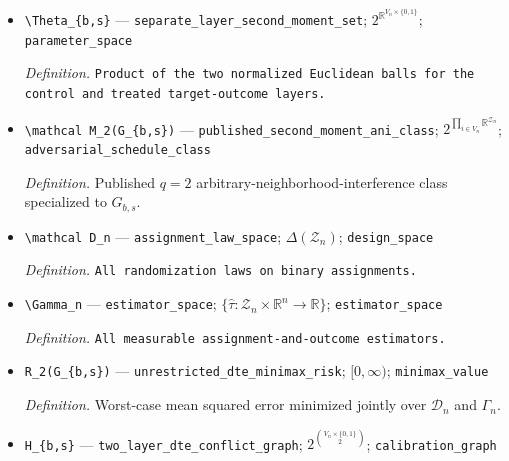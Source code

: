 \documentclass{article}
\begin{document}
\begin{itemize}
  \par\smallskip\noindent\emph{Definition.} \(\tau_{\mathrm{DTE}}(Y)=n^{-1}\sum_{i\in V_n}(u_{i,1}-u_{i,0})\).
  \item \texttt{\textbackslash{}\allowbreak{}Theta\_\allowbreak{}\{b,\allowbreak{}s\}\allowbreak{}} --- \texttt{separate\_\allowbreak{}layer\_\allowbreak{}second\_\allowbreak{}moment\_\allowbreak{}set}; \(2^{\mathbb R^{V_n\times\{0,1\}}}\); \texttt{parameter\_\allowbreak{}space}
  \par\smallskip\noindent\emph{Definition.} \texttt{Product of the two normalized Euclidean balls for the control and treated target-\allowbreak{}outcome layers.}
  \item \texttt{\textbackslash{}\allowbreak{}mathcal M\_\allowbreak{}2(G\_\allowbreak{}\{b,\allowbreak{}s\}\allowbreak{})} --- \texttt{published\_\allowbreak{}second\_\allowbreak{}moment\_\allowbreak{}ani\_\allowbreak{}class}; \(2^{\prod_{i\in V_n}\mathbb R^{\mathcal Z_n}}\); \texttt{adversarial\_\allowbreak{}schedule\_\allowbreak{}class}
  \par\smallskip\noindent\emph{Definition.} Published \(q=2\) arbitrary-neighborhood-interference class specialized to \(G_{b,s}\).
  \item \texttt{\textbackslash{}\allowbreak{}mathcal D\_\allowbreak{}n} --- \texttt{assignment\_\allowbreak{}law\_\allowbreak{}space}; \(\Delta(\mathcal Z_n)\); \texttt{design\_\allowbreak{}space}
  \par\smallskip\noindent\emph{Definition.} \texttt{All randomization laws on binary assignments.}
  \item \texttt{\textbackslash{}\allowbreak{}Gamma\_\allowbreak{}n} --- \texttt{estimator\_\allowbreak{}space}; \(\{\widehat\tau:\mathcal Z_n\times\mathbb R^n\to\mathbb R\}\); \texttt{estimator\_\allowbreak{}space}
  \par\smallskip\noindent\emph{Definition.} \texttt{All measurable assignment-\allowbreak{}and-\allowbreak{}outcome estimators.}
  \item \texttt{R\_\allowbreak{}2(G\_\allowbreak{}\{b,\allowbreak{}s\}\allowbreak{})} --- \texttt{unrestricted\_\allowbreak{}dte\_\allowbreak{}minimax\_\allowbreak{}risk}; \([0,\infty)\); \texttt{minimax\_\allowbreak{}value}
  \par\smallskip\noindent\emph{Definition.} Worst-case mean squared error minimized jointly over \(\mathcal D_n\) and \(\Gamma_n\).
  \item \texttt{H\_\allowbreak{}\{b,\allowbreak{}s\}\allowbreak{}} --- \texttt{two\_\allowbreak{}layer\_\allowbreak{}dte\_\allowbreak{}conflict\_\allowbreak{}graph}; \(2^{\binom{V_n\times\{0,1\}}{2}}\); \texttt{calibration\_\allowbreak{}graph}

\end{itemize}
\end{document}
